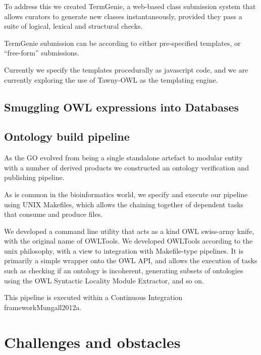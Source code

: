 \documentclass{llncs}
\begin{document}
To address this we created TermGenie\cite{Dietze2014}, a web-based
class submission system that allows curators to generate new classes
instantaneously, provided they pass a suite of logical, lexical and
structural checks.

TermGenie submission can be according to either pre-specified
templates, or ``free-form'' submissions.

Currently we specify the templates procedurally as javascript code,
and we are currently exploring the use of Tawny-OWL\cite{Tawny} as the
templating engine.



\subsection{Smuggling OWL expressions into Databases}

\cite{Huntley2014}


\subsection{Ontology build pipeline}

As the GO evolved from being a single standalone artefact to modular
entity with a number of derived products we constructed an ontology
verification and publishing pipeline.

As is common in the bioinformatics world, we specify and execute our
pipeline using UNIX Makefiles, which allows the chaining together of
dependent tasks that consume and produce files.

We developed a command line utility that acts as a kind OWL swiss-army
knife, with the original name of OWLTools\cite{OWLTools}. We developed
OWLTools according to the unix philosophy, with a view to integration
with Makefile-type pipelines. It is primarily a simple wrapper onto
the OWL API, and allows the execution of tasks such as checking if an
ontology is incoherent, generating subsets of ontologies using the OWL
Syntactic Locality Module Extractor, and so on.

This pipeline is executed within a Continuous Integration
framework{Mungall2012a}.



\section{Challenges and obstacles}
\end{document}
